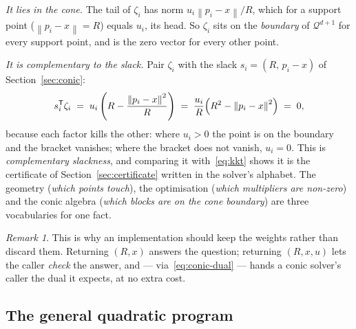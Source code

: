 \documentclass[11pt,a4paper]{article}
\theoremstyle{plain}
\theoremstyle{definition}
\theoremstyle{remark}
\newtheorem*{remark}{Remark}
\newcommand{\norm}[1]{\left\lVert #1 \right\rVert}
\newcommand{\transpose}{^{\mathsf{T}}}
\begin{document}
\emph{It lies in the cone.} The tail of $\zeta_i$ has norm
$u_i\norm{p_i-x}/R$, which for a support point ($\norm{p_i-x}=R$) equals $u_i$,
its head. So $\zeta_i$ sits on the \emph{boundary} of $\mathcal{Q}^{d+1}$ for
every support point, and is the zero vector for every other point.

\emph{It is complementary to the slack.} Pair $\zeta_i$ with the slack
$s_i=(R,\,p_i-x)$ of Section~\ref{sec:conic}:
\[
  s_i\transpose \zeta_i
    \;=\; u_i\left(R - \frac{\norm{p_i-x}^2}{R}\right)
    \;=\; \frac{u_i}{R}\Bigl(R^2 - \norm{p_i-x}^2\Bigr) \;=\; 0 ,
\]
because each factor kills the other: where $u_i>0$ the point is on the boundary
and the bracket vanishes; where the bracket does not vanish, $u_i=0$. This is
\emph{complementary slackness}, and comparing it with~\eqref{eq:kkt} shows it is
the certificate of Section~\ref{sec:certificate} written in the solver's
alphabet. The geometry (\emph{which points touch}), the optimisation (\emph{which
multipliers are non-zero}) and the conic algebra (\emph{which blocks are on the
cone boundary}) are three vocabularies for one fact.

\begin{remark}
  This is why an implementation should keep the weights rather than discard
  them. Returning $(R,x)$ answers the question; returning $(R,x,u)$ lets the
  caller \emph{check} the answer, and --- via~\eqref{eq:conic-dual} --- hands a
  conic solver's caller the dual it expects, at no extra cost.
\end{remark}

\subsection{The general quadratic program}
\label{sec:gi}
\end{document}
